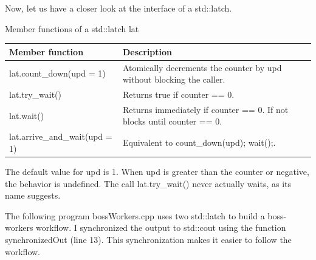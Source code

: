 Now, let us have a closer look at the interface of a std::latch.

\begin{center}
Member functions of a std::latch lat
\end{center}

\begin{table}[H]
\centering
\begin{tabular}{ll}
\textbf{Member function} & \textbf{Description}          \\ \hline
lat.count\_down(upd = 1)       & Atomically decrements the counter by upd without blocking the caller.  \\
lat.try\_wait()          & Returns true if counter == 0. \\
lat.wait()                     & Returns immediately if counter == 0. If not blocks until counter == 0. \\
lat.arrive\_and\_wait(upd = 1) & Equivalent to count\_down(upd); wait();.                              
\end{tabular}
\end{table}

The default value for upd is 1. When upd is greater than the counter or negative, the behavior is undefined. The call lat.try\_wait() never actually waits, as its name suggests.

The following program bossWorkers.cpp uses two std::latch to build a boss-workers workflow. I synchronized the output to std::cout using the function synchronizedOut (line 13). This synchronization makes it easier to follow the workflow.

